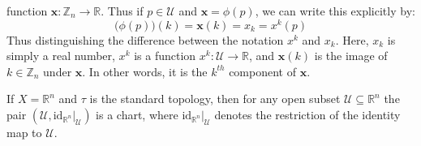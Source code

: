        function $\mathbf{x}:\mathbb{Z}_{n}\rightarrow\mathbb{R}$. Thus if
        $p\in\mathcal{U}$ and $\mathbf{x}=\phi(p)$, we can write this
        explicitly by:
        \begin{equation}
            \big(\phi(p)\big)(k)=\mathbf{x}(k)=x_{k}=x^{k}(p)
        \end{equation}
        Thus distinguishing the difference between the notation $x^{k}$ and
        $x_{k}$. Here, $x_{k}$ is simply a real number, $x^{k}$ is a function
        $x^{k}:\mathcal{U}\rightarrow\mathbb{R}$, and $\mathbf{x}(k)$ is the
        image of $k\in\mathbb{Z}_{n}$ under $\mathbf{x}$. In other words, it is
        the $k^{th}$ component of $\mathbf{x}$.
        \begin{example}
            If $X=\mathbb{R}^{n}$ and $\tau$ is the standard topology, then
            for any open subset $\mathcal{U}\subseteq\mathbb{R}^{n}$ the
            pair $(\mathcal{U},\textrm{id}_{\mathbb{R}^{n}}|_{\mathcal{U}})$
            is a chart, where $\textrm{id}_{\mathbb{R}^{n}}|_{\mathcal{U}}$
            denotes the restriction of the identity map to $\mathcal{U}$.
        \end{example}
